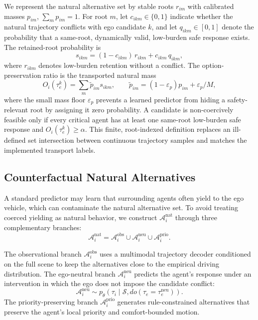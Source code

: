 \documentclass[10pt]{article}
\begin{document}
We represent the natural alternative set by stable roots $r_{im}$ with calibrated masses $p_{im}$, $\sum_m p_{im}=1$. For root $m$, let $c_{ikm}\in\{0,1\}$ indicate whether the natural trajectory conflicts with ego candidate $k$, and let $q_{ikm}\in[0,1]$ denote the probability that a same-root, dynamically valid, low-burden safe response exists. The retained-root probability is
\begin{equation}
    s_{ikm}=(1-c_{ikm})\,r_{ikm}+c_{ikm}\,q_{ikm},
\end{equation}
where $r_{ikm}$ denotes low-burden retention without a conflict. The option-preservation ratio is the transported natural mass
\begin{equation}
    O_i(\tau^k_e)=\sum_m \widetilde p_{im}s_{ikm},
    \qquad
    \widetilde p_{im}=(1-\varepsilon_p)p_{im}+\varepsilon_p/M,
    \label{eq:option_preservation}
\end{equation}
where the small mass floor $\varepsilon_p$ prevents a learned predictor from hiding a safety-relevant root by assigning it zero probability. A candidate is non-coercively feasible only if every critical agent has at least one same-root low-burden safe response and $O_i(\tau^k_e)\ge\alpha$. This finite, root-indexed definition replaces an ill-defined set intersection between continuous trajectory samples and matches the implemented transport labels.

\subsection{Counterfactual Natural Alternatives}
\label{sec:method_counterfactual}

A standard predictor may learn that surrounding agents often yield to the ego vehicle, which can contaminate the natural alternative set. To avoid treating coerced yielding as natural behavior, we construct $\mathcal{A}^{\mathrm{nat}}_i$ through three complementary branches:
\begin{equation}
    \mathcal{A}^{\mathrm{nat}}_i
    =
    \mathcal{A}^{\mathrm{obs}}_i
    \cup
    \mathcal{A}^{\mathrm{neu}}_i
    \cup
    \mathcal{A}^{\mathrm{prio}}_i .
    \label{eq:natural_union}
\end{equation}

The observational branch $\mathcal{A}^{\mathrm{obs}}_i$ uses a multimodal trajectory decoder conditioned on the full scene to keep the alternatives close to the empirical driving distribution. The ego-neutral branch $\mathcal{A}^{\mathrm{neu}}_i$ predicts the agent's response under an intervention in which the ego does not impose the candidate conflict:
\begin{equation}
    \mathcal{A}^{\mathrm{neu}}_i
    \sim
    p_\theta(\tau_i \mid \mathcal{S}, do(\tau_e=\tau^{\mathrm{neu}}_e)).
\end{equation}
The priority-preserving branch $\mathcal{A}^{\mathrm{prio}}_i$ generates rule-constrained alternatives that preserve the agent's local priority and comfort-bounded motion.
\end{document}
